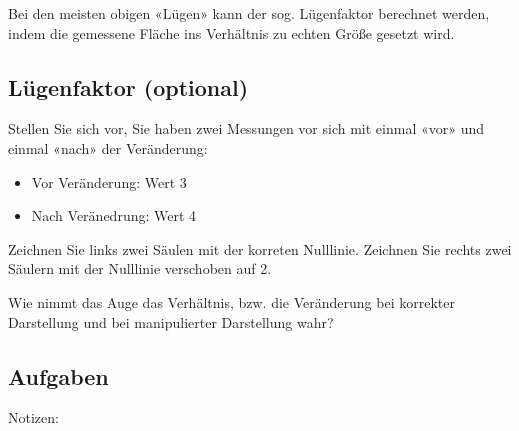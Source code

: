 Bei den meisten obigen «Lügen» kann der sog. Lügenfaktor berechnet werden, indem die gemessene Fläche ins Verhältnis zu echten Größe gesetzt wird.
\newpage
\subsection*{Lügenfaktor (optional)}
Stellen Sie sich vor, Sie haben zwei Messungen vor sich mit einmal «vor» und einmal «nach» der Veränderung:
\begin{itemize}
\item Vor Veränderung: Wert 3
\item Nach Veränedrung: Wert 4
\end{itemize}

Zeichnen Sie links zwei Säulen mit der korreten Nulllinie. Zeichnen Sie rechts zwei Säulern mit der Nulllinie verschoben auf 2.


Wie nimmt das Auge das Verhältnis, bzw. die Veränderung bei korrekter Darstellung und bei manipulierter Darstellung wahr?

\newpage

\subsection*{Aufgaben}

Notizen:



\newpage
